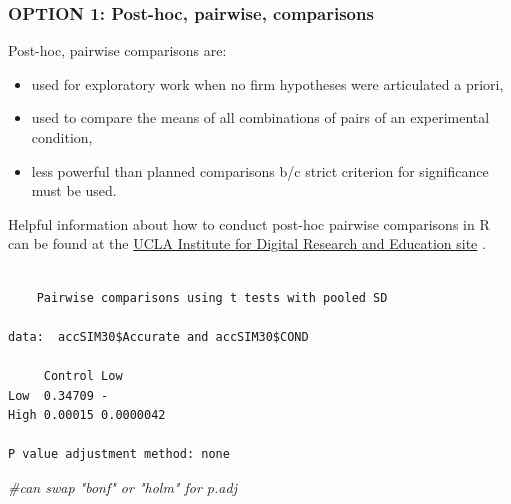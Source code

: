 \documentclass[
  11pt,
]{book}
\newenvironment{Shaded}{\begin{snugshade}}{\end{snugshade}}
\newcommand{\AttributeTok}[1]{\textcolor[rgb]{0.77,0.63,0.00}{#1}}
\newcommand{\CommentTok}[1]{\textcolor[rgb]{0.56,0.35,0.01}{\textit{#1}}}
\newcommand{\FunctionTok}[1]{\textcolor[rgb]{0.00,0.00,0.00}{#1}}
\newcommand{\NormalTok}[1]{#1}
\newcommand{\SpecialCharTok}[1]{\textcolor[rgb]{0.00,0.00,0.00}{#1}}
\newcommand{\StringTok}[1]{\textcolor[rgb]{0.31,0.60,0.02}{#1}}
\providecommand{\tightlist}{%
  \setlength{\itemsep}{0pt}\setlength{\parskip}{0pt}}
\begin{document}
\hypertarget{option-1-post-hoc-pairwise-comparisons}{%
\subsubsection{OPTION 1: Post-hoc, pairwise, comparisons}\label{option-1-post-hoc-pairwise-comparisons}}

Post-hoc, pairwise comparisons are:

\begin{itemize}
\tightlist
\item
  used for exploratory work when no firm hypotheses were articulated a priori,
\item
  used to compare the means of all combinations of pairs of an experimental condition,
\item
  less powerful than planned comparisons b/c strict criterion for significance must be used.
\end{itemize}

Helpful information about how to conduct post-hoc pairwise comparisons in R can be found at the \href{https://stats.idre.ucla.edu/r/faq/how-can-i-do-post-hoc-pairwise-comparisons-in-r/}{UCLA Institute for Digital Research and Education site} \citep{noauthor_how_nodate}.

\begin{Shaded}
\end{Shaded}

\begin{verbatim}

    Pairwise comparisons using t tests with pooled SD 

data:  accSIM30$Accurate and accSIM30$COND 

     Control Low      
Low  0.34709 -        
High 0.00015 0.0000042

P value adjustment method: none 
\end{verbatim}

\begin{Shaded}
\begin{Highlighting}[]
\CommentTok{\#can swap "bonf" or "holm" for p.adj}
\end{Highlighting}
\end{Shaded}
\end{document}
